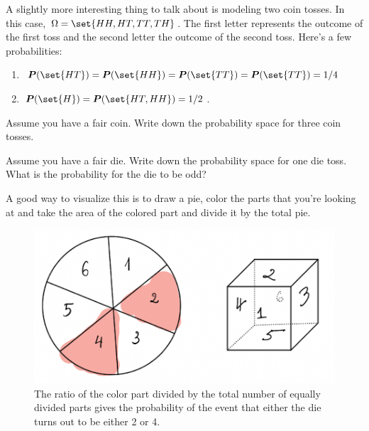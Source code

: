 \begin{example}
A slightly more interesting thing to talk about is modeling two coin tosses.
In this case, $\Omega = \set{HH, HT, TT,TH}$.
The first letter represents the outcome of the first toss and the second letter the outcome of the second toss.
Here's a few probabilities:
\begin{enumerate}
    \item $\P(\set{HT}) = \P(\set{HH}) = \P(\set{TT})= \P(\set{TT}) = 1/4$
    \item $\P(\set{H}) = \P(\set{HT, HH})  = 1/2$.
\end{enumerate}
\end{example}

\begin{exercise}
    Assume you have a fair coin. Write down the probability space  for three coin tosses.
\end{exercise}

\begin{example}
    Assume you have a fair die. Write down the probability space for one die toss.
    What is the probability for the die to be odd?

    A good way to visualize this is to draw a pie, color the parts that you're looking at and take the area of the colored part and divide it by the total pie.

    \begin{figure}[htpb]
        \centering
        \includegraphics[width=0.8\linewidth]{Figures/pie}
        \caption{The ratio of the color part divided by the total number of equally divided parts gives the probability of the event
        that either the die turns out to be either 2 or 4.}%
        \label{fig:Pie}
    \end{figure}
\end{example}


